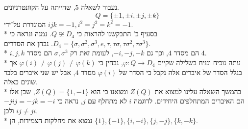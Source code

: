 נעבור לשאלה 5, שהייתה על הקוונטרניונים.
\[
	Q = \{ \pm 1, \pm i, \pm j, \pm k \}
\]
המוגדרת על־ידי $ijk = -1, i^2 = j^2 = k^2 = -1$. \\*
בסעיף ב' התבקשנו להראות כי $Q \not\cong D_4$.
נמנה ונראה כי $D_4 = \{ \sigma, \sigma^2, \sigma^3, e, \tau, \tau \sigma, \tau \sigma^2, \tau \sigma^3 \}$. נבחן את הסדרים. \\*
$i, j, k$ הם מסדר $4$, וכך גם $-i, -j, -k$, לעומת זאת רק $\sigma, \sigma^3$ הם מסדר $4$. \\*
עתה נוכיח ונניח בשלילה שקיים $\varphi : Q \to D_4$, נבחין כי $\varphi(i) \ne \varphi(j) \ne \varphi(k)$ אך בגלל הסדר של איברים אלה נקבל כי הסדר של $\varphi(i)$ מסדר $4$, אבל יש שני איברים בלבד שונים כאלה. \\*
בהמשך השאלה עלינו למצוא את $Z(Q)$ ומצאנו כי הוא $Z(Q) = \{1, -1\}$, שכן אלו הם האיברים המתחלפים היחידים. לדוגמה $i$ לא מתחלף עם $j$, נראה כי $-j i j = -j k = -i$ ולכן $ij \ne ji$. \\*
נמצא את מחלקות הצמידות, הן $\{1\}, \{-1\}, \{i, -i\}, \{j, -j\}, \{k, -k\}$.

